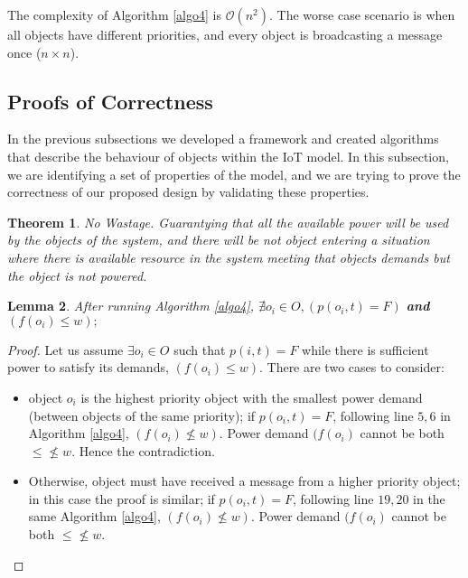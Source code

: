 \documentclass[../main/IoT.tex]{subfiles}
\begin{document}
The complexity of Algorithm \ref{algo4} is $\mathcal{O}(n^2)$. The worse case scenario is when all objects have different priorities, and every object is broadcasting a message once ($n\times n$).

\subsection{Proofs of Correctness}
In the previous subsections we developed a framework and created algorithms that describe the behaviour of objects within the IoT model. In this subsection, we are identifying a set of properties of the model, and we are trying to prove the correctness of our proposed design by validating these properties.
\newtheorem{theorem}{Theorem}[section]
\newtheorem{lemma}[theorem]{Lemma}
\begin{theorem}
\emph{No Wastage}. Guarantying that all the available power will be used by the objects of the system, and there will be not object entering a situation where there is available resource in the system meeting that objects demands but the object is not powered.
\end{theorem}

\begin{lemma}\label{lemma1}
  After running Algorithm \ref{algo4}, $\nexists o_{i}\in O, (p(o_{i},t) = F)$ \textbf{and} $(f(o_{i})\leq w); $
\end{lemma}

\begin{proof} Let us assume $\exists o_{i} \in O$ such that $p(i,t)=F$ while there is sufficient power to satisfy its demands, $(f(o_{i})\leq w)$. There are two cases to consider:

\begin{itemize}
  \item object $o_{i}$ is the highest priority object with the smallest power demand (between objects of the same priority); if $p(o_{i},t)=F$, following line $5,6$ in Algorithm \ref{algo4}, $(f(o_{i})\nleq w)$. Power demand $(f(o_{i})$ cannot be both $\leq\nleq w$. Hence the contradiction.
  \item Otherwise, object must have received a message from a higher priority object; in this case the proof is similar; if $p(o_{i},t)=F$, following line $19, 20$ in the same Algorithm \ref{algo4}, $(f(o_{i})\nleq w)$. Power demand $(f(o_{i})$ cannot be both $\leq\nleq w$.
\end{itemize}
\end{proof}
\end{document}
